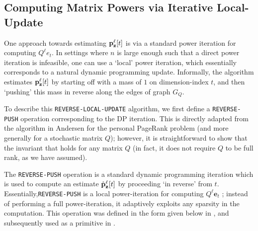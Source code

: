

\subsection{Computing Matrix Powers via Iterative Local-Update}
\label{ssec:reverse}

One approach towards estimating ${\mathbf{p}}_\mathbf{z}^{\ell}[t]$ is via a standard power iteration for computing $Q^{\ell}e_t$. 
In settings where $n$ is large enough such that a direct power iteration is infeasible, one can use a `local' power iteration, which essentially corresponds to a natural dynamic programming update. Informally, the algorithm estimates ${\mathbf{p}}_\mathbf{z}^{\ell}[t]$ by starting off with a mass of $1$ on dimension-index $t$, and then `pushing' this mass in reverse along the edges of graph $G_Q$. 

To describe this \texttt{REVERSE-LOCAL-UPDATE} algorithm, we first define a \texttt{REVERSE-PUSH} operation corresponding to the DP iteration. 
This is directly adapted from the algorithm in Andersen \cite{andersen2007local} for the personal PageRank problem (and more generally for a stochastic matrix $Q$); however, it is straightforward to show that the invariant that holds for any matrix $Q$ (in fact, it does not require $Q$ to be full rank, as we have assumed).
 
The \texttt{REVERSE-PUSH} operation is a standard dynamic programming iteration which is used to compute an estimate $\hat{\mathbf{p}}_\mathbf{z}^{\ell}[t]$ by proceeding `in reverse' from $t$. 
Essentially,\texttt{REVERSE-PUSH} is a local power-iteration for computing $Q^{\ell}\mathbf{e}_t$ ; instead of performing a full power-iteration, it adaptively exploits any sparsity in the computation.
This operation was defined in the form given below in \cite{andersen2007local}, and subsequently used as a primitive in \cite{banerjee2015fast, lee2014asynchronous}.


